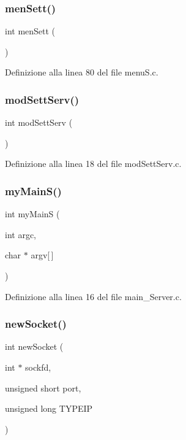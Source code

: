 \subsubsection{\texorpdfstring{menSett()}{menSett()}}
{\footnotesize\ttfamily int men\+Sett (\begin{DoxyParamCaption}{ }\end{DoxyParamCaption})}



Definizione alla linea 80 del file menu\+S.\+c.

\mbox{\label{a00050_acd1f4ad00301185734118d32a0ed391b}} 
\subsubsection{\texorpdfstring{modSettServ()}{modSettServ()}}
{\footnotesize\ttfamily int mod\+Sett\+Serv (\begin{DoxyParamCaption}{ }\end{DoxyParamCaption})}



Definizione alla linea 18 del file mod\+Sett\+Serv.\+c.

\mbox{\label{a00050_a77c974b2a79a9a1413f9ce1fb1e1a69a}} 
\subsubsection{\texorpdfstring{myMainS()}{myMainS()}}
{\footnotesize\ttfamily int my\+MainS (\begin{DoxyParamCaption}\item[{int}]{argc,  }\item[{char $\ast$}]{argv\mbox{[}$\,$\mbox{]} }\end{DoxyParamCaption})}



Definizione alla linea 16 del file main\+\_\+\+Server.\+c.

\mbox{\label{a00050_a7d98cd038e0cc100b29cb96ddc0b35da}} 
\subsubsection{\texorpdfstring{newSocket()}{newSocket()}}
{\footnotesize\ttfamily int new\+Socket (\begin{DoxyParamCaption}\item[{int $\ast$}]{sockfd,  }\item[{unsigned short}]{port,  }\item[{unsigned long}]{T\+Y\+P\+E\+IP }\end{DoxyParamCaption})}



